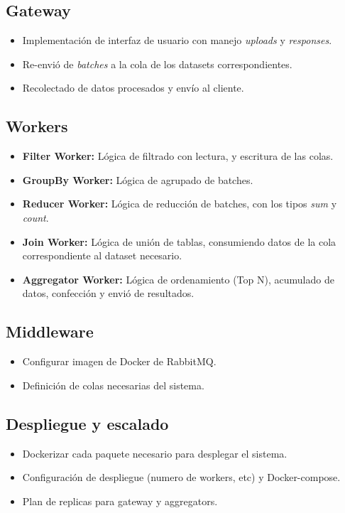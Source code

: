 \subsection{Gateway}
\begin{itemize}
  \item Implementación de interfaz de usuario con manejo \textit{uploads} y \textit{responses}.
  \item Re-envió de \textit{batches} a la cola de los datasets correspondientes.
  \item Recolectado de datos procesados y envío al cliente.
\end{itemize}

\subsection{Workers}
\begin{itemize}
  \item \textbf{Filter Worker:} Lógica de filtrado con lectura, y escritura de las colas.
  \item \textbf{GroupBy Worker:} Lógica de agrupado de batches.
  \item \textbf{Reducer Worker:} Lógica de reducción de batches, con los tipos \textit{sum} y \textit{count}.
  \item \textbf{Join Worker:} Lógica de unión de tablas, consumiendo datos de la cola correspondiente al dataset necesario.
  \item \textbf{Aggregator Worker:} Lógica de ordenamiento (Top N), acumulado de datos, confección y envió de resultados.
\end{itemize}

\subsection{Middleware}
\begin{itemize}
  \item Configurar imagen de Docker de RabbitMQ.
  \item Definición de colas necesarias del sistema.
\end{itemize}

\subsection{Despliegue y escalado}
\begin{itemize}
  \item Dockerizar cada paquete necesario para desplegar el sistema.
  \item Configuración de despliegue (numero de workers, etc) y Docker-compose.
  \item Plan de replicas para gateway y aggregators.
\end{itemize}

